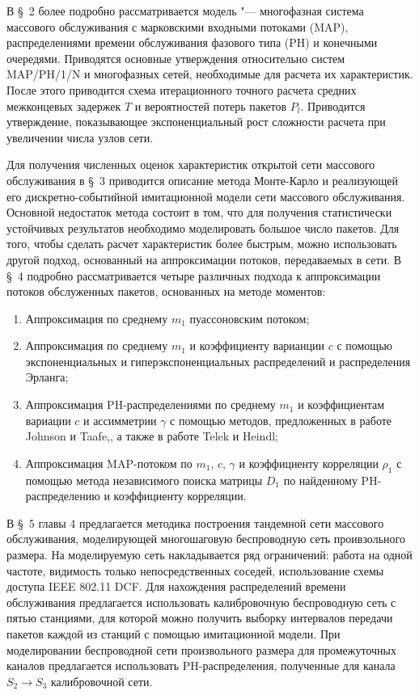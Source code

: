 В \S~2 более подробно рассматривается модель "--- многофазная система массового обслуживания с марковскими входными потоками (MAP), распределениями времени обслуживания фазового типа (PH) и конечными очередями. Приводятся основные утверждения относительно систем MAP/PH/1/N и многофазных сетей, необходимые для расчета их характеристик. После этого приводится схема итерационного точного расчета средних межконцевых задержек $T$ и вероятностей потерь пакетов $P_l$. Приводится утверждение, показывающее экспоненциальный рост сложности расчета при увеличении числа узлов сети.

Для получения численных оценок характеристик открытой сети массового обслуживания в \S~3 приводится описание метода Монте-Карло и реализующей его дискретно-событийной имитационной модели сети массового обслуживания. Основной недостаток метода состоит в том, что для получения статистически устойчивых результатов необходимо моделировать большое число пакетов. Для того, чтобы сделать расчет характеристик более быстрым, можно использовать другой подход, основанный на аппроксимации потоков, передаваемых в сети. В \S~4 подробно рассматривается четыре различных подхода к аппроксимации потоков обслуженных пакетов, основанных на методе моментов:
\begin{enumerate}
  \item Аппроксимация по среднему $m_1$ пуассоновским потоком;
  \item Аппроксимация по среднему $m_1$ и коэффициенту варианции $c$ с помощью экспоненциальных и гиперэкспоненциальных распределений и распределения Эрланга;
  \item Аппроксимация PH-распределениями по среднему $m_1$ и коэффициентам вариации $c$ и ассимметрии $\gamma$ с помощью методов, предложенных в работе Johnson и Taafe,\autocite{Johnson1989}, а также в работе Telek и Heindl\autocite{Telek2003};
  \item Аппроксимация MAP-потоком по $m_1$, $c$, $\gamma$ и коэффициенту корреляции $\rho_1$ с помощью метода \autocite{Horvath2005} независимого поиска матрицы $D_1$ по найденному PH-распределению и коэффициенту корреляции.
\end{enumerate}

В \S~5 главы 4 предлагается методика построения тандемной сети массового обслуживания, моделирующей многошаговую беспроводную сеть проивзольного размера. На моделируемую сеть накладывается ряд ограничений: работа на одной частоте, видимость только непосредственных соседей, использование схемы доступа IEEE 802.11 DCF. Для нахождения распределений времени обслуживания предлагается использовать калибровочную беспроводную сеть с пятью станциями, для которой можно получить выборку интервалов передачи пакетов каждой из станций с помощью имитационной модели. При моделировании беспроводной сети произвольного размера для промежуточных каналов предлагается использовать PH-распределения, полученные для канала $S_2 \rightarrow S_3$ калибровочной сети.

